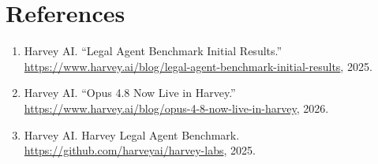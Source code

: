 \documentclass[11pt,a4paper]{article}
\begin{document}
\section*{References}

\begin{enumerate}[leftmargin=2em]
\item Harvey AI. ``Legal Agent Benchmark Initial Results.'' \url{https://www.harvey.ai/blog/legal-agent-benchmark-initial-results}, 2025.
\item Harvey AI. ``Opus 4.8 Now Live in Harvey.'' \url{https://www.harvey.ai/blog/opus-4-8-now-live-in-harvey}, 2026.
\item Harvey AI. Harvey Legal Agent Benchmark. \url{https://github.com/harveyai/harvey-labs}, 2025.
\end{enumerate}
\end{document}
